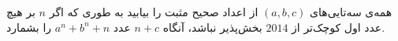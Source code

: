 همه‌ی سه‌تایی‌های $(a,b,c)$ از اعداد صحیح مثبت را بیابید به طوری که اگر $n$ بر هیچ عدد اول کوچک‌تر از $2014$ بخش‌پذیر نباشد، آنگاه $n+c$ عدد $a^n + b^n + n$ را بشمارد.
